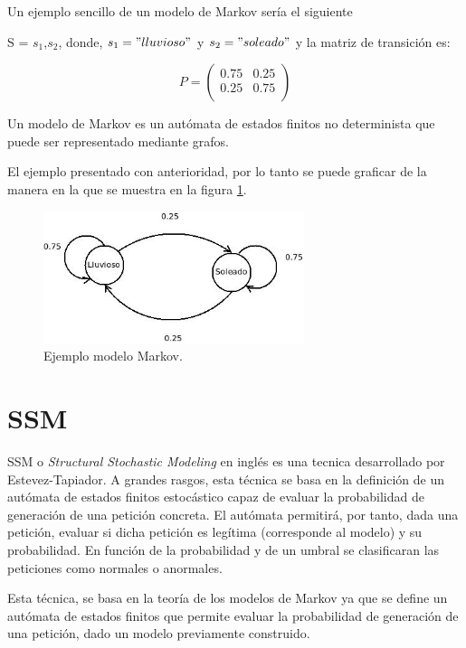 Un ejemplo sencillo de un modelo de Markov sería el siguiente \cite{ejemploMarkov}

S = {$s_{1}$,$s_{2}$}, donde, $s_{1} = "lluvioso"$ y $s_{2} = "soleado"$ y la matriz de transición es:

\[
 P = \begin{pmatrix}
  0.75 & 0.25  \\
  0.25 & 0.75  \\
 \end{pmatrix}
\]

Un modelo de Markov es un autómata de estados finitos no determinista que puede ser representado mediante grafos.

El ejemplo presentado con anterioridad, por lo tanto se puede graficar de la manera en la que se muestra en la figura \ref{fig:modeloMarkov}.

\begin{figure}[tb]
\begin{center}
\includegraphics[width=3in]{./img/ejemploMarkov.jpeg}
\caption{Ejemplo modelo Markov.}
\label{fig:modeloMarkov}
\end{center}
\end{figure}


\section{SSM}\label{sec:modeloSSM}

SSM o \textit{Structural Stochastic Modeling} en ingl\'es es una tecnica desarrollado por Estevez-Tapiador. A grandes rasgos, esta t\'ecnica se basa en la definición de un autómata de estados finitos estocástico capaz de evaluar la probabilidad de generación de una petición concreta. El autómata permitirá, por tanto, dada una petición, evaluar si dicha petición es legítima (corresponde al modelo) y su probabilidad. En función de la probabilidad y de un umbral se clasificaran las peticiones como normales o anormales.\cite{ssm}

Esta t\'ecnica, se basa en la teor\'ia de los modelos de Markov ya que se define un autómata de estados finitos que permite evaluar la probabilidad de generaci\'on de una petici\'on, dado un modelo previamente construido.

